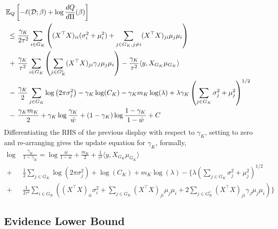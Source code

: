 \documentclass[12pt]{article}
\begin{document}
\begin{equation*}
\begin{aligned}
    \mathbb{E}_{Q} & \left[ 
	- \ell(\mathcal{D}; \beta) + \log \frac{dQ}{d\Pi}(\beta) 
    \right]  \\
\leq &\
    \frac{\gamma_K}{2\tau^2}
    \sum_{i \in G_K} \left( 
	    (X^\top X)_{ii} (\sigma_i^2 + \mu_i^2)
	+
	\sum_{j \in G_K, j\neq i} 
	    (X^\top X)_{ji} \mu_j \mu_i
    \right ) \\
+ &\
    \frac{\gamma_K}{\tau^2}
    \sum_{i \in G_K} \left( 
    \sum_{j \in G_K^c} (X^\top X)_{ji} 
	\gamma_{J} \mu_j \mu_i
    \right )
-
    \frac{\gamma_K}{\tau^2} \langle y, X_{G_K} \mu_{G_K} \rangle \\
- &\
    \frac{\gamma_K}{2} \sum_{j \in G_K} \log \left( 2 \pi \sigma_j^2 \right) 
-
    \gamma_K \log(C_K )
-
    \gamma_K m_K \log (\lambda) 
+
    \lambda \gamma_K \left( \sum_{j \in G_K} 
	\sigma_j^2 + \mu_j^2
    \right)^{1/2} \\
- &\
    \frac{\gamma_K m_K}{2} 
+ 
    \gamma_K \log \frac{\gamma_K}{\bar{w}}
+ 
    (1 - \gamma_K) \log \frac{1 - \gamma_K}{1 - \bar{w}}
+ C
\end{aligned}
\end{equation*}
Differentiating the RHS of the previous display with respect to $\gamma_K$, setting to zero and re-arranging gives the update equation for $\gamma_K$, formally,
\begin{equation} \label{eq:update_gamma} 
\begin{aligned}
    \log &\ \frac{\gamma_K}{1-\gamma_K} = 
    \log \frac{\bar{w}}{1-\bar{w}}
+ 
    \frac{m_K}{2}  
+
    \frac{1}{\tau^2} \langle y, X_{G_K} \mu_{G_K} \rangle  \\
+ &\ 
    \frac{1}{2} \sum_{j \in G_K} \log \left( 2 \pi \sigma_j^2 \right)
+
    \log(C_K )
+
    m_K \log (\lambda)
-
\Bigg\{ 
    \lambda \left( \sum_{j \in G_K} 
	\sigma_j^2 + \mu_j^2
    \right)^{1/2}  \\
+ &\
    \frac{1}{2\tau^2}
    \sum_{i \in G_K} \left( 
    (X^\top X)_{ii} \sigma_i^2
    +
    \sum_{j \in G_K} 
	(X^\top X)_{ji} \mu_j \mu_i
+
    2 \sum_{j \in G_K^c} (X^\top X)_{ji} 
	\gamma_{J} \mu_j \mu_i
    \right )
\Bigg\}
\end{aligned}
\end{equation}


\subsection{Evidence Lower Bound}
\end{document}
